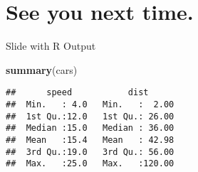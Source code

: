 \documentclass[
  ignorenonframetext,
  aspectratio=169,
  xcolor=dvipsnames]{beamer}
\newenvironment{Shaded}{\begin{snugshade}}{\end{snugshade}}
\newcommand{\FunctionTok}[1]{\textcolor[rgb]{0.13,0.29,0.53}{\textbf{#1}}}
\newcommand{\NormalTok}[1]{#1}
\let\oldShaded\Shaded
\let\endoldShaded\endShaded
\renewenvironment{Shaded}{\footnotesize\oldShaded}{\endoldShaded}
\begin{document}
\section{See you next time.}\label{see-you-next-time.}

\begin{frame}{}
\label{section-3}
\end{frame}

\begin{frame}[fragile]{Slide with R Output}
\label{slide-with-r-output}
\begin{Shaded}
\begin{Highlighting}[]
\FunctionTok{summary}\NormalTok{(cars)}
\end{Highlighting}
\end{Shaded}

\begin{verbatim}
##      speed           dist       
##  Min.   : 4.0   Min.   :  2.00  
##  1st Qu.:12.0   1st Qu.: 26.00  
##  Median :15.0   Median : 36.00  
##  Mean   :15.4   Mean   : 42.98  
##  3rd Qu.:19.0   3rd Qu.: 56.00  
##  Max.   :25.0   Max.   :120.00
\end{verbatim}
\end{frame}
\end{document}
